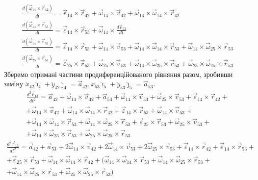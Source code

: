 \documentclass[12pt]{article}
\begin{document}
 	\begin{gather*}
 	\frac{d(\vec{\omega}_{14} \times \vec{r}_{42})}{d t} = \vec{\epsilon}_{14} \times \vec{r}_{42} + \vec{\omega}_{14} \times \vec{v}_{42} + \vec{\omega}_{14} \times \vec{\omega}_{14} \times \vec{r}_{42}\\
 	\frac{d(\vec{\omega}_{14} \times \vec{r}_{53})}{d t} = \vec{\varepsilon}_{14} \times \vec{r}_{53}+\vec{\omega}_{14} \times \frac{d \vec{r}_{53}}{d t} \\
 	\frac{d(\vec{\omega}_{14} \times \vec{r}_{53})}{d t}= \vec{\varepsilon}_{14} \times \vec{r}_{53} + \vec{\omega}_{14} \times \vec{v}_{53} + \vec{\omega}_{14} \times \vec{\omega}_{14}  \times \vec{r}_{53} + \vec{\omega}_{14} \times \vec{\omega}_{25}  \times \vec{r}_{53}\\
 	\frac{d(\vec{\omega}_{25} \times \vec{r}_{53})}{d t} = \vec{\varepsilon}_{25} \times \vec{r}_{53} + \vec{\omega}_{25} \times \vec{v}_{53} + \vec{\omega}_{14} \times \vec{\omega}_{25}  \times \vec{r}_{53} + \vec{\omega}_{25} \times \vec{\omega}_{25}  \times \vec{r}_{53}
 	\end{gather*}
 	Зберемо отримані частини продиференційованого рівняння разом, зробивши заміну $\ddot{x}_{42} \hat{\imath}_{4} + \ddot{y}_{42} \hat{\jmath}_{4} = \vec{a}_{42}, \ddot{x}_{53} \hat{\imath}_{5} + \ddot{y}_{53} \hat{\jmath}_{5} = \vec{a}_{53}$.
 	\begin{multline}
 	\frac{d^2\vec{r}_{13}}{d t^2} = \vec{a}_{42} + \vec{\omega}_{14} \times \vec{v}_{42} + \vec{a}_{53} + \vec{\omega}_{14} \times \vec{v}_{53} + \vec{\omega}_{25} \times \vec{v}_{53} + \vec{\varepsilon}_{14} \times \vec{r}_{42} + \\+ \vec{\omega}_{14} \times \vec{v}_{42} + \vec{\omega}_{14} \times \vec{\omega}_{14} \times \vec{r}_{42} + \vec{\varepsilon}_{14} \times \vec{r}_{53} + \vec{\omega}_{14} \times \vec{v}_{53} + \\ + \vec{\omega}_{14} \times \vec{\omega}_{14}  \times \vec{r}_{53} + \vec{\omega}_{14} \times \vec{\omega}_{25}  \times \vec{r}_{53} + \vec{\varepsilon}_{25} \times \vec{r}_{53} + \vec{\omega}_{25} \times \vec{v}_{53} + \\ + \vec{\omega}_{14} \times \vec{\omega}_{25}  \times \vec{r}_{53} + \vec{\omega}_{25} \times \vec{\omega}_{25}  \times \vec{r}_{53}
 	\end{multline}
 	\begin{multline}
 	\frac{d^2\vec{r}_{13}}{d t^2} =  \vec{a}_{42} + \vec{a}_{53} + 2 \vec{\omega}_{14} \times \vec{v}_{42} + 2 \vec{\omega}_{14} \times \vec{v}_{53} + 2 \vec{\omega}_{25} \times \vec{v}_{53} + \vec{\varepsilon}_{14} \times \vec{r}_{42} + \vec{\varepsilon}_{14} \times \vec{r}_{53} + \\+ \vec{\varepsilon}_{25} \times \vec{r}_{53} + \vec{\omega}_{14} \times \vec{\omega}_{14} \times \vec{r}_{42} + (\vec{\omega}_{14} \times \vec{\omega}_{14}  \times \vec{r}_{53} + \vec{\omega}_{14} \times \vec{\omega}_{25}  \times \vec{r}_{53} + \\ + \vec{\omega}_{14} \times \vec{\omega}_{25}  \times \vec{r}_{53} + \vec{\omega}_{25} \times \vec{\omega}_{25}  \times \vec{r}_{53})
 	\end{multline}
 	
\end{document}
